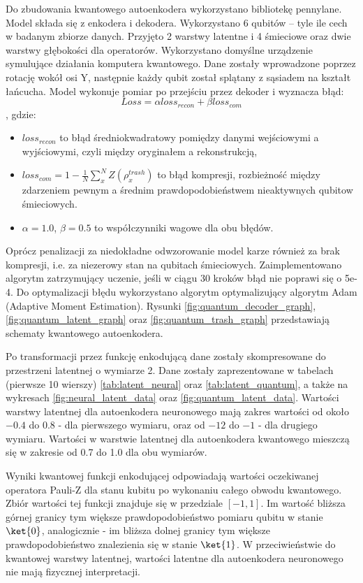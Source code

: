 Do zbudowania kwantowego autoenkodera wykorzystano bibliotekę pennylane. Model składa się z enkodera i dekodera. Wykorzystano 6 qubitów – tyle ile cech w badanym zbiorze danych. Przyjęto 2 warstwy latentne i 4 śmieciowe oraz dwie warstwy głębokości dla operatorów. Wykorzystano domyślne urządzenie symulujące działania komputera kwantowego. Dane zostały wprowadzone poprzez rotację wokół osi Y, następnie każdy qubit został splątany z sąsiadem na kształt łańcucha.
Model wykonuje pomiar po przejściu przez dekoder i wyznacza błąd:
\[ Loss = \alpha loss_{recon} + \beta loss_{com}\],
gdzie:
\begin{itemize}
    \item $loss_{recon}$ to błąd średniokwadratowy pomiędzy danymi wejściowymi a wyjściowymi, czyli między oryginałem a rekonstrukcją,
    \item $loss_{com} = 1 - \frac{1}{N}\sum_{x}^{N}Z\left(\rho_{x}^{trash}\right)$ to błąd kompresji, rozbieżność między zdarzeniem pewnym a średnim prawdopodobieństwem nieaktywnych qubitow śmieciowych.
    \item $\alpha = 1.0$, $\beta=0.5$ to współczynniki wagowe dla obu błędów.
\end{itemize}

Oprócz penalizacji za niedokładne odwzorowanie model karze również za brak kompresji, i.e. za niezerowy stan na qubitach śmieciowych.
Zaimplementowano algorytm zatrzymujący uczenie, jeśli w ciągu 30 kroków błąd nie poprawi się o 5e-4. Do optymalizacji błędu wykorzystano algorytm optymalizujący algorytm Adam (Adaptive Moment Estimation). 
Rysunki \ref{fig:quantum_decoder_graph}, \ref{fig:quantum_latent_graph} oraz \ref{fig:quantum_trash_graph} przedstawiają schematy kwantowego autoenkodera.

Po transformacji przez funkcję enkodującą dane zostały skompresowane do przestrzeni latentnej o wymiarze 2. Dane zostały zaprezentowane w tabelach (pierwsze 10 wierszy) \ref{tab:latent_neural} oraz \ref{tab:latent_quantum}, a także na wykresach \ref{fig:neural_latent_data} oraz \ref{fig:quantum_latent_data}. Wartości warstwy latentnej dla autoenkodera neuronowego mają zakres wartości od około $-0.4$ do $0.8$ - dla pierwszego wymiaru, oraz od $-12$ do $-1$ - dla drugiego wymiaru. Wartości w warstwie latentnej dla autoenkodera kwantowego mieszczą się w zakresie od 0.7 do 1.0 dla obu wymiarów. 

Wyniki kwantowej funkcji enkodującej odpowiadają wartości oczekiwanej operatora Pauli-Z dla stanu kubitu po wykonaniu całego obwodu kwantowego. Zbiór wartości tej funkcji znajduje się w przedziale $[-1,1]$. Im wartość bliższa górnej granicy tym większe prawdopodobieństwo pomiaru qubitu w stanie $\ket{0}$, analogicznie - im bliższa dolnej granicy tym większe prawdopodobieństwo znalezienia się w stanie $\ket{1}$. 
W przeciwieństwie do kwantowej warstwy latentnej, wartości latentne dla autoenkodera neuronowego nie mają fizycznej interpretacji. 

